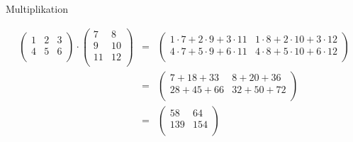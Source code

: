 \documentclass[german]{beamer}
\newcommand{\bq}{\begin{eqnarray*}}
\newcommand{\eq}{\end{eqnarray*}}
\begin{document}
\begin{frame}{Multiplikation}

\begin{example}
{\footnotesize
\bq
\left( \begin{array}{ccc}
 1 & 2 & 3 \\
 4 & 5 & 6 \\
\end{array} \right)
 \cdot
\left( \begin{array}{cc}
 7 & 8 \\
 9 & 10 \\
 11 & 12 \\
\end{array} \right)
 & = &
\left( \begin{array}{cc}
 1 \cdot 7 + 2 \cdot 9 + 3 \cdot 11 & 1 \cdot 8 + 2 \cdot 10 + 3 \cdot 12 \\
 4 \cdot 7 + 5 \cdot 9 + 6 \cdot 11 & 4 \cdot 8 + 5 \cdot 10 + 6 \cdot 12 \\
\end{array} \right)
 \nonumber \\
 & = &
\left( \begin{array}{cc}
 7 + 18 + 33 & 8 + 20 + 36 \\
 28 + 45 + 66 & 32 + 50 + 72 \\
\end{array} \right)
 \nonumber \\
 & = &
\left( \begin{array}{cc}
 58 & 64 \\
 139 & 154 \\
\end{array} \right)
\eq
}
\end{example}

\end{frame}
\end{document}
